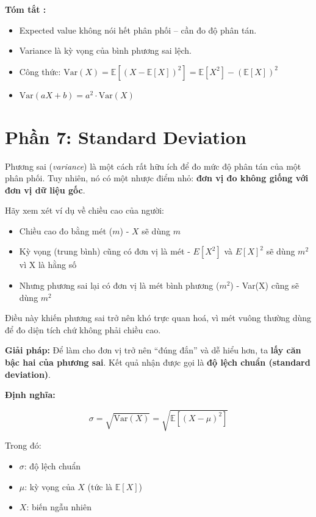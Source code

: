 \documentclass[11pt]{article}
\begin{document}
\vspace{1em}

\begin{summarybox}
    \textbf{Tóm tắt :}
    \begin{itemize}
        \item Expected value không nói hết phân phối – cần đo độ phân tán.
        \item Variance là kỳ vọng của bình phương sai lệch.
        \item Công thức: $\text{Var}(X) = \mathbb{E}[(X - \mathbb{E}[X])^2] = \mathbb{E}[X^2] - (\mathbb{E}[X])^2$
        \item $\text{Var}(aX + b) = a^2 \cdot \text{Var}(X)$
    \end{itemize}
\end{summarybox}

\newpage 

\section{Phần 7: Standard Deviation}
Phương sai (\textit{variance}) là một cách rất hữu ích để đo mức độ phân tán của một phân phối.  
Tuy nhiên, nó có một nhược điểm nhỏ: \textbf{đơn vị đo không giống với đơn vị dữ liệu gốc}.

Hãy xem xét ví dụ về chiều cao của người:
\begin{itemize}
    \item Chiều cao đo bằng mét ($m$) -  $X$ sẽ dùng $m$
    \item Kỳ vọng (trung bình) cũng có đơn vị là mét - $E[X^2]$ và $E[X]^2$ sẽ dùng $m^2$ vì X là hằng số
    \item Nhưng phương sai lại có đơn vị là mét bình phương ($m^2$) - Var(X) cũng sẽ dùng $m^2$
\end{itemize}

Điều này khiến phương sai trở nên khó trực quan hoá, vì mét vuông thường dùng để đo diện tích chứ không phải chiều cao.

\vspace{0.5em}
\noindent
\textbf{Giải pháp:} Để làm cho đơn vị trở nên “đúng đắn” và dễ hiểu hơn, ta \textbf{lấy căn bậc hai của phương sai}.  
Kết quả nhận được gọi là \textbf{độ lệch chuẩn (standard deviation)}.

\vspace{1em}
\textbf{Định nghĩa:}

\[
\sigma = \sqrt{\text{Var}(X)} = \sqrt{\mathbb{E}[(X - \mu)^2]}
\]

Trong đó:
\begin{itemize}
    \item $\sigma$: độ lệch chuẩn
    \item $\mu$: kỳ vọng của $X$ (tức là $\mathbb{E}[X]$)
    \item $X$: biến ngẫu nhiên
\end{itemize}
\end{document}
